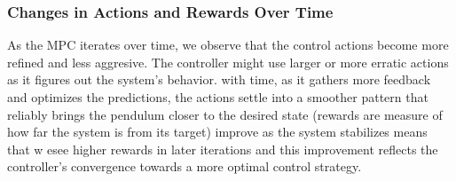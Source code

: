 \subsubsection{Changes in Actions and Rewards Over Time}
As the MPC iterates over time, we observe that the control actions become more refined and less aggresive. The controller might use larger or more erratic actions as it figures out the system's behavior. with time, as it gathers more feedback and optimizes the predictions, the actions settle into a smoother pattern that reliably brings the pendulum closer to the desired state (rewards are measure of how far the system is from its target) improve as the system stabilizes means that w esee higher rewards in later iterations and this improvement reflects the controller's convergence towards a more optimal control strategy.